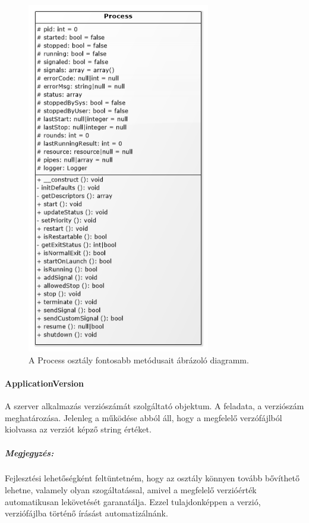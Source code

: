 \documentclass[12pt]{report}
\begin{document}
  \begin{figure}[ht]
       \centering
         \includegraphics[width=8cm]{pics/proc.png}
	  \caption{A Process osztály fontosabb metódusait ábrázoló diagramm.}
  \end{figure}
  
  \paragraph{ApplicationVersion}
  A szerver alkalmazás verziószámát szolgáltató objektum. A feladata, a verziószám meghatározása. Jelenleg a működése abból áll, hogy a megfelelő verzófájlból kiolvassa az verziót képző string értéket.
  \subparagraph{Megjegyzés:} Fejlesztési lehetőségként feltüntetném, hogy az osztály könnyen tovább bővíthető lehetne, valamely olyan szogáltatással, amivel a megfelelő verzióérték automatikusan lekövetését garanatálja. Ezzel tulajdonképpen a verzió, verziófájlba történő írásást automatizálnánk.
\end{document}
